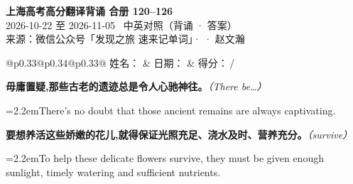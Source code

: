 \documentclass[11pt,a4paper]{article}
\newcommand{\num}[1]{\makebox[1.9em][r]{#1.}\hspace{0.3em}}
\newcommand{\prompt}[1]{\emph{\textcolor{tipblue}{\small（#1）}}}
\begin{document}
\pagestyle{plain}
\begin{center}
{\LARGE\bfseries 上海高考高分翻译背诵 \quad 合册 120–126}\\[0.25em]
{\large 2026-10-22 至 2026-11-05 \quad\ 中英对照（背诵 · 答案）}\\[0.35em]
{\footnotesize 来源：微信公众号「发现之旅 速来记单词」·  · 赵文瀚}
\end{center}

\vspace{0.4em}
\noindent\begin{tabular}{@{}p{0.33\textwidth}@{}p{0.34\textwidth}@{}p{0.33\textwidth}@{}}
姓名：\underline{\hspace{2.0cm}} & 日期：\underline{\hspace{2.0cm}} & 得分：\underline{\hspace{1.4cm}}\,/ \\
\end{tabular}

\vspace{0.5em}

\vspace{0.8em}
\vspace{0.35em}\vspace{0.15em}

\begin{minipage}{\linewidth}

\num{1}\textbf{毋庸置疑,那些古老的遗迹总是令人心驰神往。}\prompt{There be…}

\vspace{0.15em}

\noindent\hangindent=2.2em\hspace{2.2em}There’s no doubt that those ancient remains are always captivating.

\end{minipage}

\begin{minipage}{\linewidth}

\num{2}\textbf{要想养活这些娇嫩的花儿,就得保证光照充足、浇水及时、营养充分。}\prompt{survive}

\vspace{0.15em}

\noindent\hangindent=2.2em\hspace{2.2em}To help these delicate flowers survive, they must be given enough sunlight, timely watering and sufficient nutrients.

\end{minipage}
\end{document}
